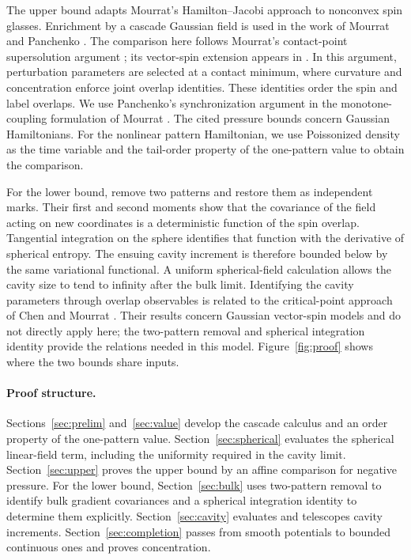 \documentclass[11pt]{article}
\begin{document}
The upper bound adapts Mourrat's Hamilton--Jacobi approach to nonconvex
spin glasses. Enrichment by a cascade Gaussian field is used in the work of
Mourrat and Panchenko \cite[Equation~(1.6) and Theorem~1.1]{MourratPanchenko2020}.
The comparison here follows Mourrat's contact-point supersolution argument
\cite[Section~4, proof of Theorem~4.1]{Mourrat2021Nonconvex}; its vector-spin
extension appears in \cite[Theorem~3.4 and Section~5]{Mourrat2023VectorUpper}.
In this argument, perturbation parameters are selected at a contact minimum,
where curvature and concentration enforce joint overlap identities. These
identities order the spin and label overlaps. We use Panchenko's
synchronization argument \cite[Section~4, Lemma~2]{Panchenko2015Multispecies}
in the monotone-coupling formulation of Mourrat
\cite[Proposition~5.2 and Theorem~5.3]{Mourrat2021Nonconvex}.
The cited pressure bounds concern Gaussian Hamiltonians. For the nonlinear
pattern Hamiltonian, we use Poissonized density as the time variable and
the tail-order property of the one-pattern value to obtain the comparison.

For the lower bound, remove two patterns and restore them as independent
marks. Their first and second moments show that the covariance of the field
acting on new coordinates is a deterministic function of the spin overlap.
Tangential integration on the sphere identifies that function with the
derivative of spherical entropy. The ensuing cavity increment is therefore
bounded below by the same variational functional. A uniform spherical-field
calculation allows the cavity size to tend to infinity after the bulk limit.
Identifying the cavity parameters through overlap observables is related to
the critical-point approach of Chen and Mourrat
\cite[Sections~6--7]{ChenMourrat2025Critical}. Their results concern Gaussian
vector-spin models and do not directly apply here; the two-pattern removal
and spherical integration identity provide the relations needed in this model.
Figure~\ref{fig:proof} shows where the two bounds share inputs.

\paragraph{Proof structure.}
Sections~\ref{sec:prelim} and~\ref{sec:value} develop the cascade calculus and
an order property of the one-pattern value. Section~\ref{sec:spherical}
evaluates the spherical linear-field term, including the uniformity required
in the cavity limit. Section~\ref{sec:upper} proves the upper bound by an
affine comparison for negative pressure. For the lower bound,
Section~\ref{sec:bulk} uses two-pattern removal to identify bulk gradient
covariances and a spherical integration identity to determine them explicitly.
Section~\ref{sec:cavity} evaluates and telescopes cavity increments.
Section~\ref{sec:completion} passes from smooth potentials to bounded
continuous ones and proves concentration.
\end{document}
